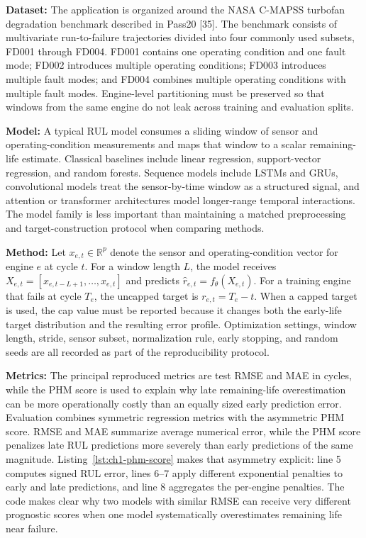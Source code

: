 \textbf{Dataset:} The application is organized around the NASA C-MAPSS turbofan degradation benchmark described in Pass20 [35]. The benchmark consists of multivariate run-to-failure trajectories divided into four commonly used subsets, FD001 through FD004. FD001 contains one operating condition and one fault mode; FD002 introduces multiple operating conditions; FD003 introduces multiple fault modes; and FD004 combines multiple operating conditions with multiple fault modes. Engine-level partitioning must be preserved so that windows from the same engine do not leak across training and evaluation splits.

\textbf{Model:} A typical RUL model consumes a sliding window of sensor and operating-condition measurements and maps that window to a scalar remaining-life estimate. Classical baselines include linear regression, support-vector regression, and random forests. Sequence models include LSTMs and GRUs, convolutional models treat the sensor-by-time window as a structured signal, and attention or transformer architectures model longer-range temporal interactions. The model family is less important than maintaining a matched preprocessing and target-construction protocol when comparing methods.

\textbf{Method:} Let \(x_{e,t}\in\mathbb{R}^{p}\) denote the sensor and operating-condition vector for engine \(e\) at cycle \(t\). For a window length \(L\), the model receives \(X_{e,t}=[x_{e,t-L+1},\ldots,x_{e,t}]\) and predicts \(\hat r_{e,t}=f_\theta(X_{e,t})\). For a training engine that fails at cycle \(T_e\), the uncapped target is \(r_{e,t}=T_e-t\). When a capped target is used, the cap value must be reported because it changes both the early-life target distribution and the resulting error profile. Optimization settings, window length, stride, sensor subset, normalization rule, early stopping, and random seeds are all recorded as part of the reproducibility protocol.

\textbf{Metrics:} The principal reproduced metrics are test RMSE and MAE in cycles, while the PHM score is used to explain why late remaining-life overestimation can be more operationally costly than an equally sized early prediction error.  Evaluation combines symmetric regression metrics with the asymmetric PHM score. RMSE and MAE summarize average numerical error, while the PHM score penalizes late RUL predictions more severely than early predictions of the same magnitude. Listing~\ref{lst:ch1-phm-score} makes that asymmetry explicit: line 5 computes signed RUL error, lines 6--7 apply different exponential penalties to early and late predictions, and line 8 aggregates the per-engine penalties. The code makes clear why two models with similar RMSE can receive very different prognostic scores when one model systematically overestimates remaining life near failure.

